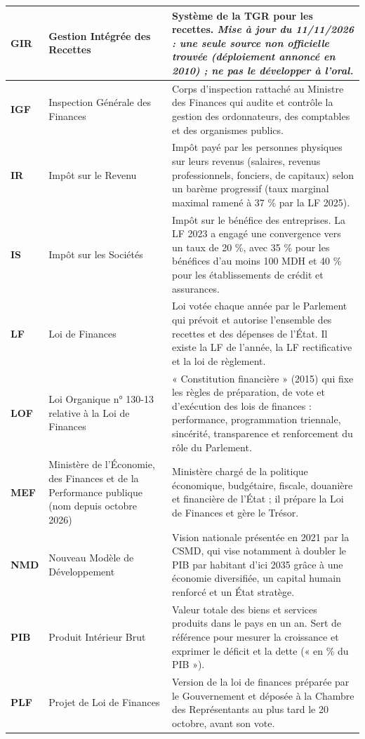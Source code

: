 {\begin{longtable}{|p{1.8cm}|p{4.9cm}|p{8.8cm}|}
\textbf{GIR} & Gestion Intégrée des Recettes & Système de la TGR pour les recettes. \textit{Mise à jour du 11/11/2026 : une seule source non officielle trouvée (déploiement annoncé en 2010) ; ne pas le développer à l'oral.} \\ \hline
\textbf{IGF} & Inspection Générale des Finances & Corps d'inspection rattaché au Ministre des Finances qui audite et contrôle la gestion des ordonnateurs, des comptables et des organismes publics. \\ \hline
\textbf{IR} & Impôt sur le Revenu & Impôt payé par les personnes physiques sur leurs revenus (salaires, revenus professionnels, fonciers, de capitaux) selon un barème progressif (taux marginal maximal ramené à 37 \% par la LF 2025). \\ \hline
\textbf{IS} & Impôt sur les Sociétés & Impôt sur le bénéfice des entreprises. La LF 2023 a engagé une convergence vers un taux de 20 \%, avec 35 \% pour les bénéfices d'au moins 100 MDH et 40 \% pour les établissements de crédit et assurances. \\ \hline
\textbf{LF} & Loi de Finances & Loi votée chaque année par le Parlement qui prévoit et autorise l'ensemble des recettes et des dépenses de l'État. Il existe la LF de l'année, la LF rectificative et la loi de règlement. \\ \hline
\textbf{LOF} & Loi Organique n° 130-13 relative à la Loi de Finances & « Constitution financière » (2015) qui fixe les règles de préparation, de vote et d'exécution des lois de finances : performance, programmation triennale, sincérité, transparence et renforcement du rôle du Parlement. \\ \hline
\textbf{MEF} & Ministère de l'Économie, des Finances et de la Performance publique (nom depuis octobre 2026) & Ministère chargé de la politique économique, budgétaire, fiscale, douanière et financière de l'État ; il prépare la Loi de Finances et gère le Trésor. \\ \hline
\textbf{NMD} & Nouveau Modèle de Développement & Vision nationale présentée en 2021 par la CSMD, qui vise notamment à doubler le PIB par habitant d'ici 2035 grâce à une économie diversifiée, un capital humain renforcé et un État stratège. \\ \hline
\textbf{PIB} & Produit Intérieur Brut & Valeur totale des biens et services produits dans le pays en un an. Sert de référence pour mesurer la croissance et exprimer le déficit et la dette (« en \% du PIB »). \\ \hline
\textbf{PLF} & Projet de Loi de Finances & Version de la loi de finances préparée par le Gouvernement et déposée à la Chambre des Représentants au plus tard le 20 octobre, avant son vote. \\ \hline

\end{longtable}}
